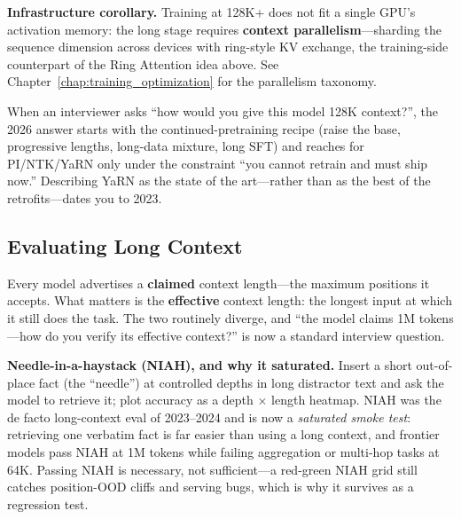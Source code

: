 \textbf{Infrastructure corollary.} Training at 128K+ does not fit a single GPU's activation memory: the long stage requires \textbf{context parallelism}---sharding the sequence dimension across devices with ring-style KV exchange, the training-side counterpart of the Ring Attention idea above. See Chapter~\ref{chap:training_optimization} for the parallelism taxonomy.

\begin{keyinsight}
When an interviewer asks ``how would you give this model 128K context?'', the 2026 answer starts with the continued-pretraining recipe (raise the base, progressive lengths, long-data mixture, long SFT) and reaches for PI/NTK/YaRN only under the constraint ``you cannot retrain and must ship now.'' Describing YaRN as the state of the art---rather than as the best of the retrofits---dates you to 2023.
\end{keyinsight}

\subsection{Evaluating Long Context}
\label{subsec:long_context_eval}

Every model advertises a \textbf{claimed} context length---the maximum positions it accepts. What matters is the \textbf{effective} context length: the longest input at which it still does the task. The two routinely diverge, and ``the model claims 1M tokens---how do you verify its effective context?'' is now a standard interview question.

\textbf{Needle-in-a-haystack (NIAH), and why it saturated.} Insert a short out-of-place fact (the ``needle'') at controlled depths in long distractor text and ask the model to retrieve it; plot accuracy as a depth $\times$ length heatmap. NIAH was the de facto long-context eval of 2023--2024 and is now a \textit{saturated smoke test}: retrieving one verbatim fact is far easier than using a long context, and frontier models pass NIAH at 1M tokens while failing aggregation or multi-hop tasks at 64K. Passing NIAH is necessary, not sufficient---a red-green NIAH grid still catches position-OOD cliffs and serving bugs, which is why it survives as a regression test.

